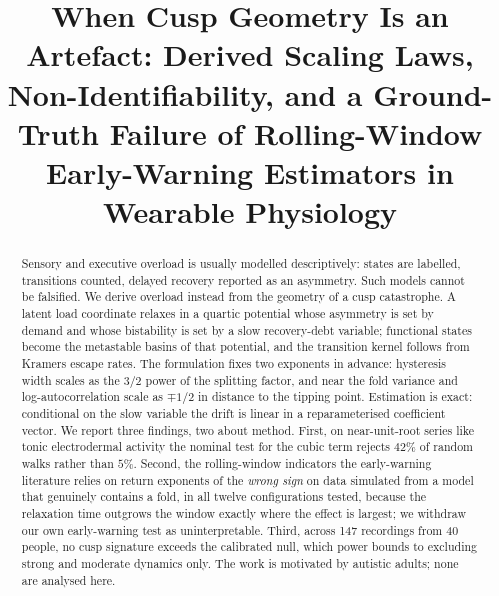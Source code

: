 \documentclass[conference]{IEEEtran}
\begin{document}
\title{When Cusp Geometry Is an Artefact: Derived Scaling Laws,
Non-Identifiability, and a Ground-Truth Failure of Rolling-Window
Early-Warning Estimators in Wearable Physiology}

\author{
}

\maketitle

\begin{abstract}
Sensory and executive overload is usually modelled descriptively: states are
labelled, transitions counted, delayed recovery reported as an asymmetry. Such
models cannot be falsified. We derive overload instead from the geometry of a
cusp catastrophe. A latent load coordinate relaxes in a quartic potential whose
asymmetry is set by demand and whose bistability is set by a slow recovery-debt
variable; functional states become the metastable basins of that potential, and
the transition kernel follows from Kramers escape rates. The formulation fixes
two exponents in advance: hysteresis width
scales as the $3/2$ power of the splitting factor, and near the fold variance
and log-autocorrelation scale as $\mp1/2$ in distance to the tipping point.
Estimation is exact: conditional on the slow variable the drift is linear in a
reparameterised coefficient vector. We report three findings, two about
method. First, on near-unit-root series like tonic electrodermal activity the
nominal test for the cubic term rejects $42\%$ of random walks rather than
$5\%$. Second, the rolling-window indicators the early-warning literature
relies on return exponents of the \emph{wrong sign} on data simulated from a
model that genuinely contains a fold, in all twelve configurations tested,
because the relaxation time outgrows the window exactly where the effect is
largest; we withdraw our own early-warning test as uninterpretable. Third,
across 147 recordings from 40 people, no cusp signature exceeds the calibrated
null, which power bounds to excluding strong and moderate dynamics only. The
work is motivated by autistic adults; none are analysed here.
\end{abstract}
\end{document}
